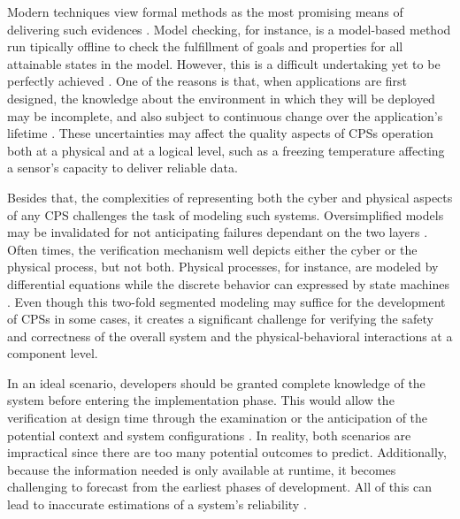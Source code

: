 Modern techniques view formal methods as the most promising means of delivering such evidences \cite{assurances2017}. Model checking, for instance, is a model-based method run tipically offline to check the fulfillment of goals and properties for all attainable states in the model. 
However, this is a difficult undertaking yet to be perfectly achieved \cite{patankar2020safety}. One of the reasons is that, when applications are first designed, the knowledge about the environment in which they will be deployed may be incomplete, and also subject to continuous change over the application's lifetime \cite{assurances2017}. These uncertainties may affect the quality aspects of CPSs operation both at a physical and at a logical level, such as a freezing temperature affecting a sensor's capacity to deliver reliable data. 

Besides that, the complexities of representing both the cyber and physical aspects of any CPS challenges the task of modeling such systems. Oversimplified models may be invalidated for not anticipating failures dependant on the two layers \cite{2014PerceptionsSOTAV&VCPS}. Often times, the verification mechanism well depicts either the cyber or the physical process, but not both. Physical processes, for instance, are modeled by differential equations while the discrete behavior can expressed by state machines \cite{Baheti2019CyberPhysicalS}. Even though this two-fold segmented modeling may suffice for the development of CPSs in some cases, it creates a significant challenge for verifying the safety and correctness of the overall system and the physical-behavioral interactions at a component level.

In an ideal scenario, developers should be granted complete knowledge of the system before entering the implementation phase. This would allow the verification at design time through the examination or the anticipation of the potential context and system configurations . In reality, both scenarios are impractical since there are too many potential outcomes to predict. Additionally, because the information needed is only available at runtime, it becomes challenging to forecast from the earliest phases of development. All of this can lead to inaccurate estimations of a system's reliability \cite{2014PerceptionsSOTAV&VCPS}.

